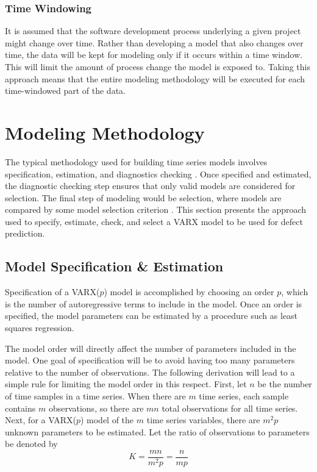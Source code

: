 \documentclass[letterpaper]{report}
\begin{document}

\subsection*{Time Windowing}
It is assumed that the software development process underlying a given project might change over time. Rather than developing a model that also changes over time, the data will be kept for modeling only if it occurs within a time window. This will limit the amount of process change the model is exposed to. Taking this approach means that the entire modeling methodology will be executed for each time-windowed part of the data.

\chapter{Modeling Methodology}
\label{sec:modeling_methodology}

The typical methodology used for building time series models involves specification, estimation, and diagnostics checking \cite[p. 478]{box_jenkins_reinsel_2008}. Once specified and estimated, the diagnostic checking step ensures that only valid models are considered for selection. The final step of modeling would be selection, where models are compared by some model selection criterion \cite[pg. 581]{box_jenkins_reinsel_2008}. This section presents the approach used to specify, estimate, check, and select a VARX model to be used for defect prediction.

\section*{Model Specification \& Estimation}
Specification of a VARX($p$) model is accomplished by choosing an order $p$, which is the number of autoregressive terms to include in the model. Once an order is specified, the model parameters can be estimated by a procedure such as least squares regression.  

The model order will directly affect the number of parameters included in the model. One goal of specification will be to avoid having too many parameters relative to the number of observations. The following derivation will lead to a simple rule for limiting the model order in this respect. First, let $n$ be the number of time samples in a time series. When there are $m$ time series, each sample contains $m$ observations, so there are $m n$ total observations for all time series. Next, for a VARX($p$) model of the $m$ time series variables, there are $m^2 p$ unknown parameters to be estimated. Let the ratio of observations to parameters be denoted by
\begin{equation}
K = \frac{m n}{m^2 p} = \frac{n}{m p}
\end{equation}
\end{document}
